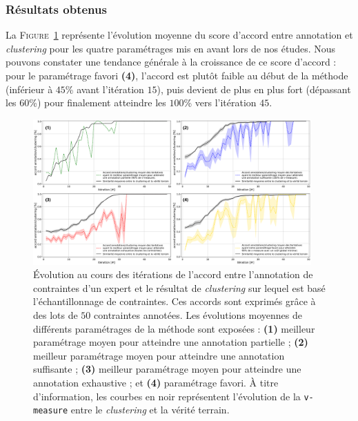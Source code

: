 		\subsubsection{Résultats obtenus}
			
			La \textsc{Figure~\ref{figure:4.5.1-ETUDE-RENTABILITE-ACCORD-ANNOTATION-CLUSTERING}} représente l'évolution moyenne du score d'accord entre annotation et \textit{clustering} pour les quatre paramétrages mis en avant lors de nos études.
			Nous pouvons constater une tendance générale à la croissance de ce score d'accord : pour le paramétrage favori \textbf{(4)}, l'accord est plutôt faible au début de la méthode (inférieur à $45$\% avant l'itération $15$), puis devient de plus en plus fort (dépassant les $60$\%) pour finalement atteindre les $100$\% vers l'itération $45$.
			\begin{figure}[!htb]
				\centering
				\includegraphics[width=0.95\textwidth]{figures/etude-rentabilite-accord-annotation}
				\caption{
					Évolution au cours des itérations de l'accord entre l'annotation de contraintes d'un expert et le résultat de \textit{clustering} sur lequel est basé l'échantillonnage de contraintes.
					Ces accords sont exprimés grâce à des lots de $50$ contraintes annotées.
					Les évolutions moyennes de différents paramétrages de la méthode sont exposées :
					\textbf{(1)} meilleur paramétrage moyen pour atteindre une annotation partielle ;
					\textbf{(2)} meilleur paramétrage moyen pour atteindre une annotation suffisante ;
					\textbf{(3)} meilleur paramétrage moyen pour atteindre une annotation exhaustive ;
					et \textbf{(4)} paramétrage favori.
					À titre d'information, les courbes en noir représentent l'évolution de la \texttt{v-measure} entre le \textit{clustering} et la vérité terrain.
				} 
				\label{figure:4.5.1-ETUDE-RENTABILITE-ACCORD-ANNOTATION-CLUSTERING}
			\end{figure}
			
